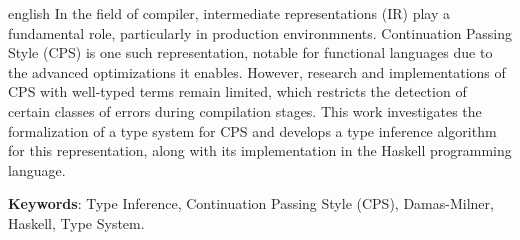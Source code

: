 
\begin{resumo}[Abstract]
  \begin{otherlanguage*}{english}
    In the field of compiler, intermediate representations (IR) play a fundamental role, particularly in production environmnents.
    Continuation Passing Style (CPS) is one such representation, notable for functional languages due to the advanced optimizations it enables.
    However, research and implementations of CPS with well-typed terms remain limited, which restricts the detection of certain classes of errors during compilation stages.
    This work investigates the formalization of a type system for CPS and develops a type inference algorithm for this representation, along with its implementation in the Haskell programming language.

    \textbf{Keywords}: Type Inference, Continuation Passing Style (CPS), Damas-Milner, Haskell, Type System.
  \end{otherlanguage*}
\end{resumo}

